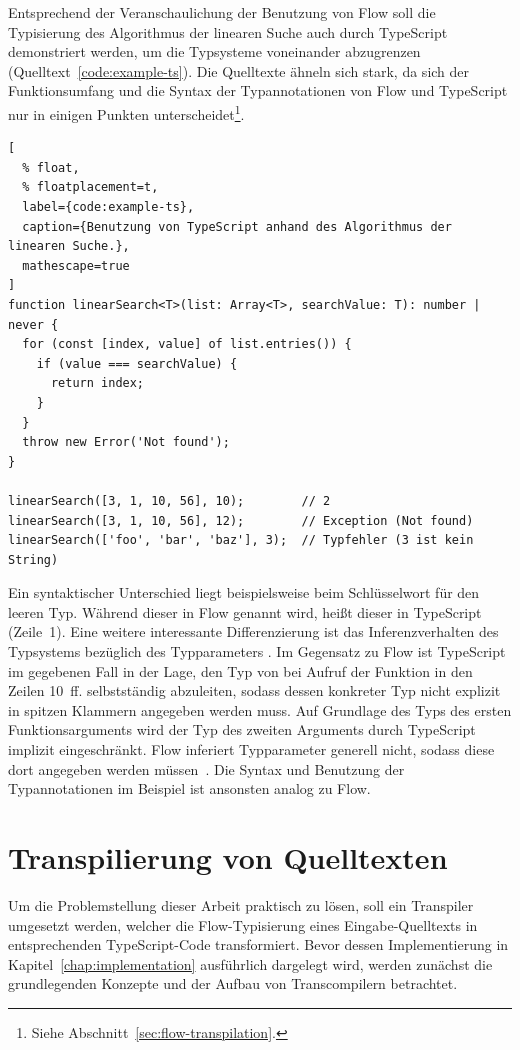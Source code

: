 Entsprechend der Veranschaulichung der Benutzung von Flow soll die Typisierung des Algorithmus der linearen Suche auch durch TypeScript demonstriert werden, um die Typsysteme voneinander abzugrenzen (Quelltext~\ref{code:example-ts}). Die Quelltexte ähneln sich stark, da sich der Funktionsumfang und die Syntax der Typannotationen von Flow und TypeScript nur in einigen Punkten unterscheidet\footnote{Siehe Abschnitt~\ref{sec:flow-transpilation}.}.

\begin{lstlisting}[
  % float,
  % floatplacement=t,
  label={code:example-ts},
  caption={Benutzung von TypeScript anhand des Algorithmus der linearen Suche.},
  mathescape=true
]
function linearSearch<T>(list: Array<T>, searchValue: T): number | never {
  for (const [index, value] of list.entries()) {
    if (value === searchValue) {
      return index;
    }
  }
  throw new Error('Not found');
}

linearSearch([3, 1, 10, 56], 10);        // 2
linearSearch([3, 1, 10, 56], 12);        // Exception (Not found)
linearSearch(['foo', 'bar', 'baz'], 3);  // Typfehler (3 ist kein String)
\end{lstlisting}

Ein syntaktischer Unterschied liegt beispielsweise beim Schlüsselwort für den leeren Typ. Während dieser in Flow  genannt wird, heißt dieser in TypeScript  (Zeile~1). Eine weitere interessante Differenzierung ist das Inferenzverhalten des Typsystems bezüglich des Typparameters . Im Gegensatz zu Flow ist TypeScript im gegebenen Fall in der Lage, den Typ von  bei Aufruf der Funktion  in den Zeilen 10~ff. selbstständig abzuleiten, sodass dessen konkreter Typ nicht explizit in spitzen Klammern angegeben werden muss. Auf Grundlage des Typs des ersten Funktionsarguments wird der Typ des zweiten Arguments durch TypeScript implizit eingeschränkt. Flow inferiert Typparameter generell nicht, sodass diese dort angegeben werden müssen~\autocite{FLOW:GENERICS}. Die Syntax und Benutzung der Typannotationen im Beispiel ist ansonsten analog zu Flow.

\section{Transpilierung von Quelltexten}
\label{sec:transpilers}

Um die Problemstellung dieser Arbeit praktisch zu lösen, soll ein Transpiler umgesetzt werden, welcher die Flow-Typisierung eines Eingabe-Quelltexts in entsprechenden TypeScript-Code transformiert. Bevor dessen Implementierung in Kapitel~\ref{chap:implementation} ausführlich dargelegt wird, werden zunächst die grundlegenden Konzepte und der Aufbau von Transcompilern betrachtet.

